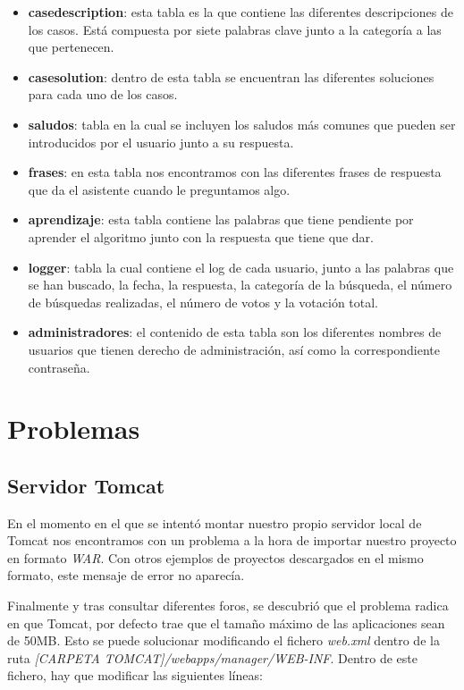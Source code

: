 \begin{itemize}
	\tightlist
	\item
	\textbf{casedescription}: esta tabla es la que contiene las diferentes descripciones de los casos. Está compuesta por siete palabras clave junto a la categoría a las que pertenecen.
	\item 
	\textbf{casesolution}: dentro de esta tabla se encuentran las diferentes soluciones para cada uno de los casos.
	\item
	\textbf{saludos}: tabla en la cual se incluyen los saludos más comunes que pueden ser introducidos por el usuario junto a su respuesta.
	\item 
	\textbf{frases}: en esta tabla nos encontramos con las diferentes frases de respuesta que da el asistente cuando le preguntamos algo.
	\item 
	\textbf{aprendizaje}: esta tabla contiene las palabras que tiene pendiente por aprender el algoritmo junto con la respuesta que tiene que dar.
	\item
	\textbf{logger}: tabla la cual contiene el log de cada usuario, junto a las palabras que se han buscado, la fecha, la respuesta, la categoría de la búsqueda, el número de búsquedas realizadas, el número de votos y la votación total.
	\item 
	\textbf{administradores}: el contenido de esta tabla son los diferentes nombres de usuarios que tienen derecho de administración, así como la correspondiente contraseña.
\end{itemize}

\section{Problemas}\label{problemas}
\subsection{Servidor Tomcat}

En el momento en el que se intentó montar nuestro propio servidor local de Tomcat nos encontramos con un problema a la hora de importar nuestro proyecto en formato \textit{WAR}. Con otros ejemplos de proyectos descargados en el mismo formato, este mensaje de error no aparecía.

Finalmente y tras consultar diferentes foros, se descubrió que el problema radica en que Tomcat, por defecto trae que el tamaño máximo de las aplicaciones sean de 50MB. Esto se puede solucionar modificando el fichero \textit{web.xml} dentro de la ruta \textit{[CARPETA TOMCAT]/webapps/manager/WEB-INF}. Dentro de este fichero, hay que modificar las siguientes líneas:


